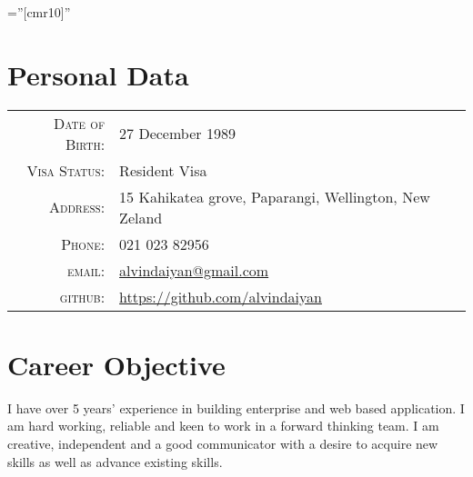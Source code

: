 \documentclass[a4paper,10pt]{article} %
\begin{document}
\pagestyle{empty} %

\font\fb=''[cmr10]'' %


\par{\bigskip\par} %

\section{Personal Data}

\begin{tabular}{rl}

\textsc{Date of Birth:} & 27 December 1989 \\
\textsc{Visa Status:} & Resident Visa \\
\textsc{Address:} & 15 Kahikatea grove, Paparangi, Wellington, New Zeland \\
\textsc{Phone:} & 021 023 82956\\
\textsc{email:} & \href{mailto:alvindaiyan@gmail.com}{alvindaiyan@gmail.com} \\
\textsc{github:} & \href{https://github.com/alvindaiyan}{https://github.com/alvindaiyan}\\

\end{tabular}




\section{Career Objective}

I have over 5 years' experience in building enterprise and web based application. I am hard working, reliable and keen to work in a forward thinking team. I am creative, independent and a good communicator with a desire to acquire new skills as well as advance existing skills.
\end{document}
